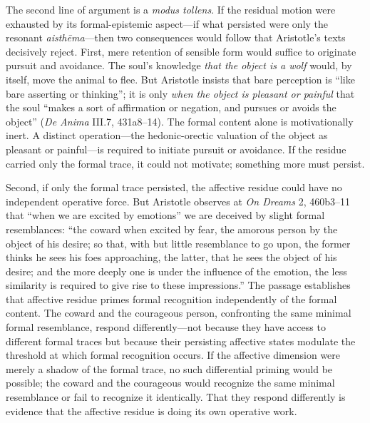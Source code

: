 \documentclass[12pt]{article}
\begin{document}
The second line of argument is a \textit{modus tollens}. If the residual motion were exhausted by its formal-epistemic aspect---if what persisted were only the resonant \textit{aisthēma}---then two consequences would follow that Aristotle's texts decisively reject. First, mere retention of sensible form would suffice to originate pursuit and avoidance. The soul's knowledge \textit{that the object is a wolf} would, by itself, move the animal to flee. But Aristotle insists that bare perception is ``like bare asserting or thinking''; it is only \textit{when the object is pleasant or painful} that the soul ``makes a sort of affirmation or negation, and pursues or avoids the object'' (\textit{De Anima} III.7, 431a8--14). The formal content alone is motivationally inert. A distinct operation---the hedonic-orectic valuation of the object as pleasant or painful---is required to initiate pursuit or avoidance. If the residue carried only the formal trace, it could not motivate; something more must persist.

Second, if only the formal trace persisted, the affective residue could have no independent operative force. But Aristotle observes at \textit{On Dreams} 2, 460b3--11 that ``when we are excited by emotions'' we are deceived by slight formal resemblances: ``the coward when excited by fear, the amorous person by the object of his desire; so that, with but little resemblance to go upon, the former thinks he sees his foes approaching, the latter, that he sees the object of his desire; and the more deeply one is under the influence of the emotion, the less similarity is required to give rise to these impressions.'' The passage establishes that affective residue primes formal recognition independently of the formal content. The coward and the courageous person, confronting the same minimal formal resemblance, respond differently---not because they have access to different formal traces but because their persisting affective states modulate the threshold at which formal recognition occurs. If the affective dimension were merely a shadow of the formal trace, no such differential priming would be possible; the coward and the courageous would recognize the same minimal resemblance or fail to recognize it identically. That they respond differently is evidence that the affective residue is doing its own operative work.
\end{document}
